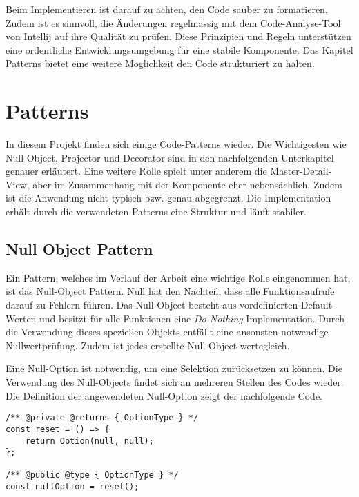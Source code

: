 Beim Implementieren ist darauf zu achten, den Code sauber zu formatieren.
Zudem ist es sinnvoll, die Änderungen regelmässig mit dem Code-Analyse-Tool von Intellij auf ihre Qualität zu prüfen. 
Diese Prinzipien und Regeln unterstützen eine ordentliche Entwicklungsumgebung für eine stabile Komponente.
Das Kapitel Patterns bietet eine weitere Möglichkeit den Code strukturiert zu halten.


\section{Patterns}
\label{sec:patterns}

In diesem Projekt finden sich einige Code-Patterns wieder.
Die Wichtigesten wie Null-Object, Projector und Decorator sind in den nachfolgenden Unterkapitel genauer erläutert.
Eine weitere Rolle spielt unter anderem die Master-Detail-View, aber im Zusammenhang mit der Komponente eher nebensächlich.
Zudem ist die Anwendung nicht typisch bzw. genau abgegrenzt.
Die Implementation erhält durch die verwendeten Patterns eine Struktur und läuft stabiler.


\subsection{Null Object Pattern}
\label{sec:nullPattern}

Ein Pattern, welches im Verlauf der Arbeit eine wichtige Rolle eingenommen hat, ist das Null-Object Pattern\footnotemark.
Null hat den Nachteil, dass alle Funktionsaufrufe darauf zu Fehlern führen.
Das Null-Object besteht aus vordefinierten Default-Werten und besitzt für alle Funktionen eine \emph{Do-Nothing}-Implementation.
Durch die Verwendung dieses speziellen Objekts entfällt eine ansonsten notwendige Nullwertprüfung.
Zudem ist jedes erstellte Null-Object wertegleich.

Eine Null-Option ist notwendig, um eine Selektion zurücksetzen zu können. 
Die Verwendung des Null-Objects findet sich an mehreren Stellen des Codes wieder.
Die Definition der angewendeten Null-Option zeigt der nachfolgende Code.

\begin{lstlisting}[style = htmlcssjs, caption = Null-Option Definition, label = code:nullOption]
/** @private @returns { OptionType } */
const reset = () => {
    return Option(null, null);
};

/** @public @type { OptionType } */
const nullOption = reset();
\end{lstlisting}

